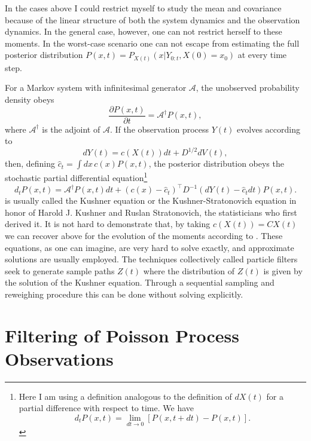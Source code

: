 {In the cases above I could restrict myself to study the mean and covariance because of the linear structure of both the system dynamics and the observation 
dynamics. In the general case, however, one can not restrict herself to these moments. In the worst-case scenario one can not escape from estimating the full posterior 
distribution $P(x,t) = P_{X(t)}(x|Y_{0:t},X(0) = x_0)$  at every time step.\par
For a Markov system with infinitesimal generator $\mathcal{A}$, the unobserved probability 
density obeys
\begin{equation}
\label{eq:kolmogorov_fw}
\frac{\partial P(x,t)}{\partial t} = \mathcal{A}^\dagger P(x,t),
\end{equation}
where $\mathcal{A}^\dagger$ is the adjoint of $\mathcal{A}$. If the observation process $Y(t)$ evolves according to
\[
dY(t) = c(X(t)) dt + D^{1/2} dV(t),
\]
then, defining $\hat{c}_t = \int dx\, c(x) P(x,t)$, the posterior distribution obeys the stochastic partial differential equation\footnote{Here I am using a definition analogous
to the definition of $dX(t)$ for a partial difference with respect to time. We have
\[
d_t P(x,t) = \lim_{dt\to 0} \left[P(x,t+dt)-P(x,t)\right].
\]}
\begin{equation}
\label{eq:kushner}
d_t P(x,t) = \mathcal{A}^\dagger P(x,t) dt + (c(x) - \hat{c}_t)^\top D^{-1} (dY(t) - \hat{c}_t dt) P(x,t).
\end{equation}
 is usually called the Kushner equation or the Kushner-Stratonovich equation in honor of Harold J. Kushner and Ruslan Stratonovich, the statisticians 
who first derived it. It is not hard to demonstrate that, by taking $c(X(t)) = C X(t)$ we can recover  above for the evolution of the moments 
according to . These equations, as one can 
imagine, are very hard to solve exactly, and approximate solutions are usually employed. The techniques collectively called particle filters seek to generate
sample paths $Z(t)$ where the distribution of $Z(t)$ is given by the solution of the Kushner equation. Through a sequential sampling and reweighing procedure
this can be done without solving  explicitly.
 
\section{Filtering of Poisson Process Observations}
 
}
